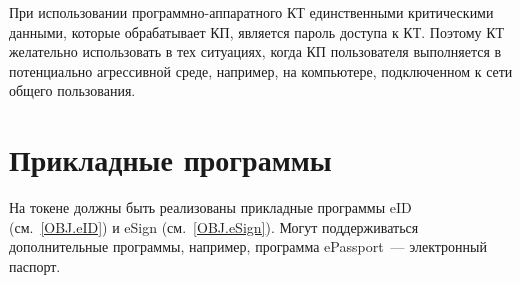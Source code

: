 При использовании программно-аппаратного КТ единственными критическими данными, 
которые обрабатывает КП, является пароль доступа к КТ. Поэтому КТ 
желательно использовать в тех ситуациях, когда КП пользователя 
выполняется в потенциально агрессивной среде, например, 
на компьютере, подключенном к сети общего пользования.

\section{Прикладные программы} 

На токене должны быть реализованы прикладные программы eID (см.~\ref{OBJ.eID}) 
и eSign (см.~\ref{OBJ.eSign}). Могут поддерживаться дополнительные программы, 
например, программа ePassport~--- электронный паспорт. 

